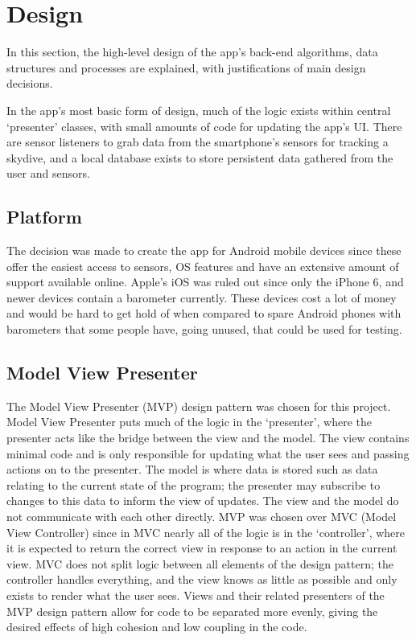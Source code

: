 \section{Design}\label{sec:design} %
In this section, the high-level design of the app's back-end algorithms, data structures and processes are explained, with justifications of main design decisions.


In the app's most basic form of design, much of the logic exists within central `presenter' classes, with small amounts of code for updating the app's UI\@. There are sensor listeners to grab data from the smartphone's sensors for tracking a skydive, and a local database exists to store persistent data gathered from the user and sensors.

\subsection{Platform}
The decision was made to create the app for Android mobile devices since these offer the easiest access to sensors, OS features and have an extensive amount of support available online. Apple's iOS was ruled out since only the iPhone 6, and newer devices contain a barometer currently. These devices cost a lot of money and would be hard to get hold of when compared to spare Android phones with barometers that some people have, going unused, that could be used for testing.

\subsection{Model View Presenter}
The Model View Presenter (MVP) design pattern was chosen for this project. Model View Presenter puts much of the logic in the `presenter', where the presenter acts like the bridge between the view and the model. The view contains minimal code and is only responsible for updating what the user sees and passing actions on to the presenter. The model is where data is stored such as data relating to the current state of the program; the presenter may subscribe to changes to this data to inform the view of updates. The view and the model do not communicate with each other directly. MVP was chosen over MVC (Model View Controller) since in MVC nearly all of the logic is in the `controller', where it is expected to return the correct view in response to an action in the current view. MVC does not split logic between all elements of the design pattern; the controller handles everything, and the view knows as little as possible and only exists to render what the user sees. Views and their related presenters of the MVP design pattern allow for code to be separated more evenly, giving the desired effects of high cohesion and low coupling in the code.

